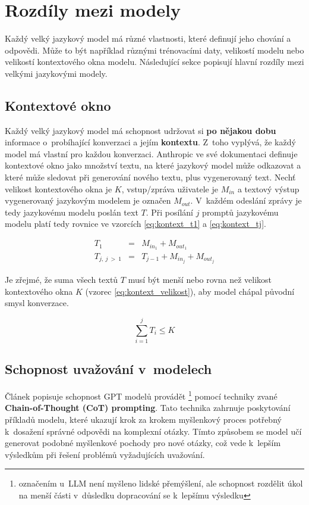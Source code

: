 \documentclass[czech, bc, kiv, he, iso690numb, pdf]{fasthesis}
\begin{document}
\section{Rozdíly mezi modely}
Každý velký jazykový model má různé vlastnosti, které definují jeho chování a odpovědi. Může to být například různými trénovacími daty, velikostí modelu nebo velikostí kontextového okna modelu. Následující sekce popisují hlavní rozdíly mezi velkými jazykovými modely.

\subsection{Kontextové okno}
Každý velký jazykový model má schopnost udržovat si \textbf{po nějakou dobu} informace o~probíhající konverzaci a jejím \textbf{kontextu}. Z~toho vyplývá, že každý model má vlastní  pro každou konverzaci. Anthropic \cite{claude-platform-context-windows} ve své dokumentaci definuje kontextové okno jako množství textu, na které jazykový model může odkazovat a které může sledovat při generování nového textu, plus vygenerovaný text. Nechť velikost kontextového okna je $K$, vstup/zpráva uživatele je $M_{in}$ a textový výstup vygenerovaný jazykovým modelem je označen $M_{out}$. V~každém odeslání zprávy je tedy jazykovému modelu poslán text $T$. Při posílání $j$ promptů jazykovému modelu platí tedy rovnice ve vzorcích \ref{eq:kontext_t1} a \ref{eq:kontext_tj}.

\begin{eqnarray}
    T_1 & = & M_{{in}_1} + M_{{out}_1} \label{eq:kontext_t1} \\
    T_{j,\ j\ >\ 1} & = & T_{j-1} + M_{{in}_j} + M_{{out}_j} \label{eq:kontext_tj}   
\end{eqnarray}

Je zřejmé, že suma všech textů $T$ musí být menší nebo rovna než velikost kontextového okna $K$ (vzorec \ref{eq:kontext_velikost}), aby model chápal původní smysl konverzace.

\begin{equation}
    \label{eq:kontext_velikost}
    \sum_{i=1}^{j} T_i \leq K
\end{equation}

\subsection{Schopnost uvažování v~modelech}\label{sec:reasoning}
Článek \cite{llm-gpt-reasoning} popisuje schopnost GPT modelů provádět \footnote{označením  u~LLM není myšleno  lidské přemýšlení, ale schopnost rozdělit úkol na menší části v~důsledku dopracování se k~lepšímu výsledku} pomocí techniky zvané \textbf{Chain-of-Thought (CoT) prompting}. Tato technika zahrnuje poskytování příkladů modelu, které ukazují krok za krokem myšlenkový proces potřebný k~dosažení správné odpovědi na komplexní otázky. Tímto způsobem se model učí generovat podobné myšlenkové pochody pro nové otázky, což vede k~lepším výsledkům při řešení problémů vyžadujících uvažování.
\end{document}

